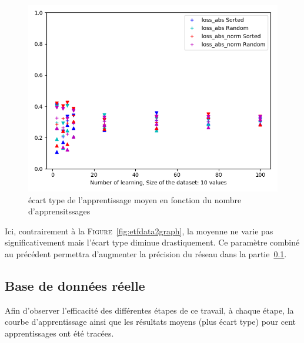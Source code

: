 \begin{figure}[H]
    \center
    \includegraphics[height=\moyen]{pict/appfn.png}
	\caption{écart type de l'apprentissage moyen en fonction du nombre d'apprensitssages}
	\label{fig:etfngraph1}
\end{figure}
\vspace{-5pt}
Ici, contrairement à la \textsc{Figure}\ \ref{fig:etfdata2graph}, la moyenne ne varie pas significativement mais l'écart type diminue drastiquement.
Ce paramètre combiné au précédent permettra d'augmenter la précision du réseau dans la partie\ \ref{subsec:real}.


\subsection{Base de données réelle}\label{subsec:real}

Afin d'observer l'efficacité des différentes étapes de ce travail,
à chaque étape, la courbe d'apprentissage ainsi que les résultats moyens
(plus écart type) pour cent apprentissages ont été tracées.

